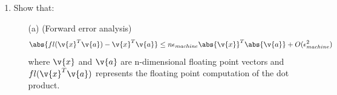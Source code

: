 \documentclass[11pt]{article}
\begin{document}
\begin{enumerate}
\begin{proof}
            Now assume that $\nabla \phi(\hat{\v{x}}) \perp K$, therefore
            $\v{x} \cdot \p{A\hat{\v{x}} - \v{b}} = 0$ for any $\v{x} \in K$.
            Let $\v{x} \in K$, then $\v{x} = \hat{\v{x}} + \v{y}$ for some
            $\v{y} \in K$.
            \begin{align*}
                \phi(\v{x}) &= \phi(\hat{\v{x}} + \v{y}) \\
                &= \frac{1}{2}\p{\hat{\v{x}} + \v{y}}^T A \p{\hat{\v{x}} + \v{y}} - \p{\hat{\v{x}} + \v{y}}^T\v{b} \\
                &= \frac{1}{2}\p{\hat{\v{x}}^T + \v{y}^T} A \p{\hat{\v{x}} + \v{y}} - \hat{\v{x}}^T\v{b} - \v{y}^T\v{b} \\
                &= \frac{1}{2}\p{\hat{\v{x}}^TA + \v{y}^TA}\p{\hat{\v{x}} + \v{y}} - \hat{\v{x}}^T\v{b} - \v{y}^T\v{b} \\
                &= \frac{1}{2}\p{\hat{\v{x}}^TA\hat{\v{x}} + \hat{\v{x}}^TA\v{y} + \v{y}^TA\hat{\v{x}} + \v{y}^TA\v{y}} - \hat{\v{x}}^T\v{b} - \v{y}^T\v{b}
                \intertext{Note that $\hat{\v{x}}^TA\v{y} = \v{y}^TA^T\hat{\v{x}} = \v{y}^TA\hat{\v{x}}$ because $A$ is symmetric}
                &= \frac{1}{2}\p{\hat{\v{x}}^TA\hat{\v{x}} + 2\v{y}^TA\hat{\v{x}} + \v{y}^TA\v{y}} - \hat{\v{x}}^T\v{b} - \v{y}^T\v{b} \\
                &= \frac{1}{2}\hat{\v{x}}^TA\hat{\v{x}} - \hat{\v{x}}^T\v{b} + \v{y}^TA\hat{\v{x}} - \v{y}^T\v{b} + \frac{1}{2}\v{y}^TA\v{y} \\
                &= \frac{1}{2}\hat{\v{x}}^TA\hat{\v{x}} - \hat{\v{x}}^T\v{b} + \v{y}^T\p{A\hat{\v{x}} - \v{b}} + \frac{1}{2}\v{y}^TA\v{y} 
                \intertext{We know that $\nabla \phi(\hat{\v{x}}) \perp K$, therefore $\v{y}^T\p{A\hat{\v{x}} - \v{b}} = 0$}
                &= \frac{1}{2}\hat{\v{x}}^TA\hat{\v{x}} - \hat{\v{x}}^T\v{b} + \frac{1}{2}\v{y}^TA\v{y} \\
                &= \phi(\hat{\v{x}}) + \frac{1}{2}\v{y}^TA\v{y}
                \intertext{Since $A$ is positive definite $\v{y}^TA\v{y} \ge 0$ and therefore}
                \phi(\v{x}) \ge \phi(\hat{\v{x}})
            \end{align*}
            This $\hat{\v{x}}$ minimizes $\phi(\v{x})$ over $K$.

            Now assume that $\hat{\v{x}}$ minimizes $\phi(\v{x})$ over $K$.
        \end{proof}

    \item %
        Show that:
        \begin{enumerate}
            \item[(a)] %
                (Forward error analysis)
                \[
                    \abs{fl(\v{x}^T \v{a}) - \v{x}^T \v{a}} \le n \epsilon_{machine} \abs{\v{x}}^T \abs{\v{a}} + O(\epsilon_{machine}^2)
                \]
                where $\v{x}$ and $\v{a}$ are n-dimensional floating point vectors and
                $fl(\v{x}^T \v{a})$ represents the floating point computation of the dot
                product.


\end{enumerate}
\end{enumerate}
\end{document}
